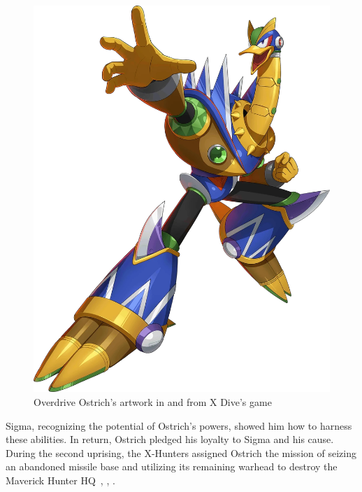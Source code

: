 \begin{figure}[htp]
	\includegraphics[height=\portraitsize]{figures/X2/Overdrive_ostrich/XOverdrive_Ostrich.png}
	\caption{Overdrive Ostrich's artwork in \cite{book:MMX_Complete_art} and from X Dive's game}
\end{figure} Sigma, recognizing the potential of Ostrich's powers, showed him how to harness these abilities. In return, Ostrich pledged his loyalty to Sigma and his cause. During the second uprising, the X-Hunters assigned Ostrich the mission of seizing an abandoned missile base and utilizing its remaining warhead to destroy the Maverick Hunter HQ~\cite{Xcoll1:Manual_X2}, \cite{wayback:X2_resources}, \cite{wiki:Overdrive_Ostrich}.

